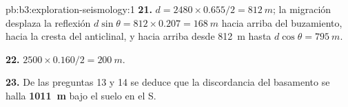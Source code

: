 \begin{solution}{pb:b3:exploration-seismology:1}
\textbf{21.} $d = 2480\times0.655/2 = \qty{812}{m}$; la migración desplaza la
reflexión $d\sin\theta = 812\times0.207 = \qty{168}{m}$ hacia arriba del buzamiento, hacia la
cresta del anticlinal, y hacia arriba desde \qty{812}{m} hasta $d\cos\theta =
\qty{795}{m}$.

\textbf{22.} $2500\times0.160/2 = \qty{200}{m}$.

\textbf{23.} De las preguntas 13 y 14 se deduce que la discordancia del
basamento se halla \textbf{\qty[text-series-to-math=true]{1011}{m}} bajo el suelo en el  S.
\end{solution}

